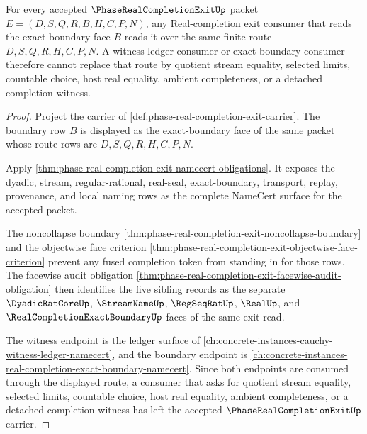 \begin{theorem}
\label{thm:phase-real-completion-exit-boundary-witness-balance}
For every accepted $\PhaseRealCompletionExitUp$ packet $E=(D,S,Q,R,B,H,C,P,N)$, any Real-completion exit consumer that reads the exact-boundary face $B$ reads it over the same finite route $D,S,Q,R,H,C,P,N$. A witness-ledger consumer or exact-boundary consumer therefore cannot replace that route by quotient stream equality, selected limits, countable choice, host real equality, ambient completeness, or a detached completion witness.
\end{theorem}
\begin{proof}
Project the carrier of \autoref{def:phase-real-completion-exit-carrier}. The boundary row $B$ is displayed as the exact-boundary face of the same packet whose route rows are $D,S,Q,R,H,C,P,N$.

Apply \autoref{thm:phase-real-completion-exit-namecert-obligations}. It exposes the dyadic, stream, regular-rational, real-seal, exact-boundary, transport, replay, provenance, and local naming rows as the complete NameCert surface for the accepted packet.

The noncollapse boundary \autoref{thm:phase-real-completion-exit-noncollapse-boundary} and the objectwise face criterion \autoref{thm:phase-real-completion-exit-objectwise-face-criterion} prevent any fused completion token from standing in for those rows. The facewise audit obligation \autoref{thm:phase-real-completion-exit-facewise-audit-obligation} then identifies the five sibling records as the separate $\DyadicRatCoreUp$, $\StreamNameUp$, $\RegSeqRatUp$, $\RealUp$, and $\RealCompletionExactBoundaryUp$ faces of the same exit read.

The witness endpoint is the ledger surface of \autoref{ch:concrete-instances-cauchy-witness-ledger-namecert}, and the boundary endpoint is \autoref{ch:concrete-instances-real-completion-exact-boundary-namecert}. Since both endpoints are consumed through the displayed route, a consumer that asks for quotient stream equality, selected limits, countable choice, host real equality, ambient completeness, or a detached completion witness has left the accepted $\PhaseRealCompletionExitUp$ carrier.
\end{proof}

